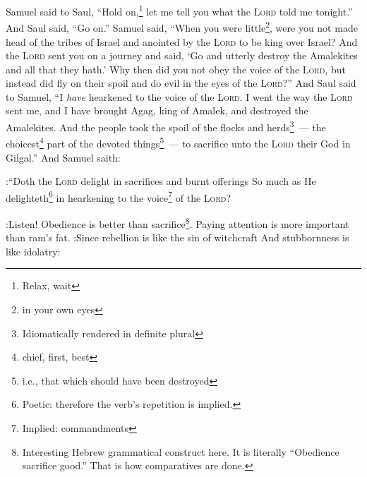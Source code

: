 \begin{enumerate*}[mode=unboxed]
     Samuel said to Saul, ``Hold on,\footnote{Relax, wait} let me tell you what the \textsc{Lord} told me tonight.'' And Saul said, ``Go on.''%
     Samuel said, ``When you were little\footnote{in your own eyes}, were you not made head of the tribes of Israel and anointed by the \textsc{Lord} to be king over Israel?%
     And the \textsc{Lord} sent you on a journey and said, `Go and utterly destroy the Amalekites and all that they hath.'%
     Why then did you not obey the voice of the \textsc{Lord}, but instead did fly on their spoil and do evil in the eyes of the \textsc{Lord}?''%
     And Saul said to Samuel, ``I \emph{have} hearkened to the voice of the \textsc{Lord}. I went the way the \textsc{Lord} sent me, and I have brought Agag, king of Amalek, and destroyed the Amalekites.%
     And the people took the spoil of the flocks and herds\footnote{Idiomatically rendered in definite plural}~--- the choicest\footnote{chief, first, best} part of the devoted things\footnote{i.e., that which should have been destroyed}~--- to sacrifice unto the \textsc{Lord} their God in Gilgal.''%
     And Samuel saith:
    
:``Doth the \textsc{Lord} delight in sacrifices and burnt offerings So much as He delighteth\footnote{Poetic: therefore the verb's repetition is implied.} in hearkening to the voice\footnote{Implied: commandments} of the \textsc{Lord}?

:Listen! Obedience is better than sacrifice\footnote{Interesting Hebrew grammatical construct here. It is literally ``Obedience sacrifice good.'' That is how comparatives are done.}. Paying attention is more important than ram's fat.%
     :Since rebellion is like the sin of witchcraft And stubbornness is like idolatry:


\end{enumerate*}
